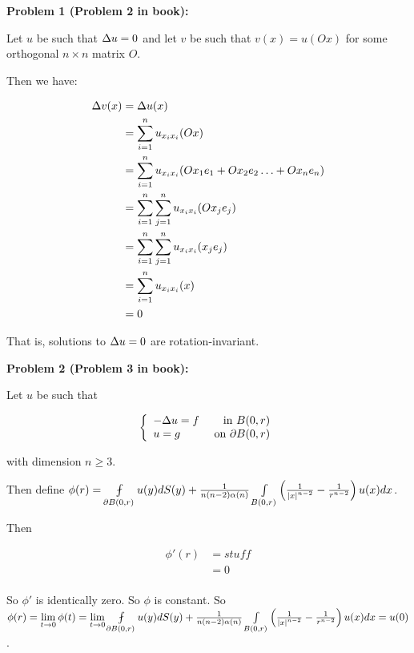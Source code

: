 \documentclass[a4paper,12pt]{article}
\begin{document}
{\bf Problem 1 (Problem 2 in book):}

Let $u$ be such that $\Delta u = 0$ and let $v$ be such that $v(x) = u(Ox)$ for some orthogonal $n\times n$  matrix $O$.

Then we have:

\begin{align*}
\Delta v(x) &= \Delta u(x)\\
&= \sum\limits_{i=1}^n u_{x_ix_i} (Ox)\\
&= \sum\limits_{i=1}^n u_{x_ix_i} (Ox_1e_1+ Ox_2e_2 \ldots + Ox_ne_n)\\
&= \sum\limits_{i=1}^n \sum\limits_{j=1}^n u_{x_ix_i} (Ox_je_j) \\
&= \sum\limits_{i=1}^n \sum\limits_{j=1}^n u_{x_ix_i} (x_je_j) \\
&= \sum\limits_{i=1}^n u_{x_ix_i} (x)\\
&= 0
\end{align*}

That is, solutions to $\Delta u = 0$ are rotation-invariant.

\shunt

{\bf Problem 2 (Problem 3 in book):}

Let $u$ be such that 

\begin{displaymath}
   \left\{
     \begin{array}{lr}
       -\Delta u = f & \text{ in } B(0,r)\\
       u=g & \text{ on }\partial B(0,r)
     \end{array}
   \right.
\end{displaymath} 

with dimension $n \geq 3$.

Then define $\phi(r) = \fint\limits_{\partial B(0,r)} u(y) dS(y) + \frac{1}{n(n-2)\al(n)} \int\limits_{B(0,r)} \left(\frac{1}{\absval{x}^{n-2}} - \frac{1}{r^{n-2}}\right) u(x) dx$.

Then 

\begin{align*}
\phi'(r) &= stuff \\
&= 0 \\ 
\end{align*}



So $\phi'$ is identically zero. So $\phi$ is constant. So $\phi(r) = \lim\limits_{t \to 0} \phi(t) = \lim\limits_{t \to 0} \fint\limits_{\partial B(0,r)} u(y) dS(y) + \frac{1}{n(n-2)\al(n)} \int\limits_{B(0,r)} \left(\frac{1}{\absval{x}^{n-2}} - \frac{1}{r^{n-2}}\right) u(x) dx = u(0)$.
\end{document}
